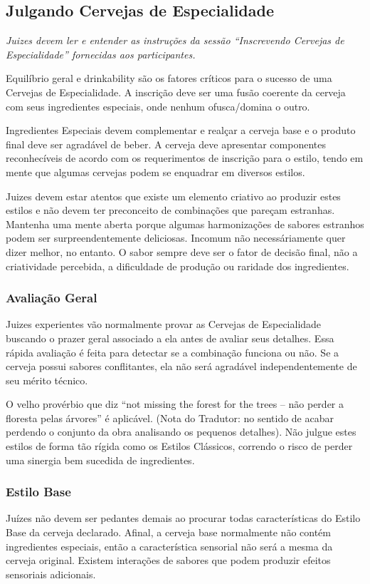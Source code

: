 \subsection*{Julgando Cervejas de Especialidade}
\textit{Juizes devem ler e entender as instruções da sessão “Inscrevendo Cervejas de Especialidade” fornecidas aos participantes.}

Equilíbrio geral e drinkability são os fatores críticos para o sucesso de uma Cervejas de Especialidade. A inscrição deve ser uma fusão coerente da cerveja com seus ingredientes especiais, onde nenhum ofusca/domina o outro.

Ingredientes Especiais devem complementar e realçar a cerveja base e o produto final deve ser agradável de beber. A cerveja deve apresentar componentes reconhecíveis de acordo com os requerimentos de inscrição para o estilo, tendo em mente que algumas cervejas podem se enquadrar em diversos estilos.

Juizes devem estar atentos que existe um elemento criativo ao produzir estes estilos e não devem ter preconceito de combinações que pareçam estranhas. Mantenha uma mente aberta porque algumas harmonizações de sabores estranhos podem ser surpreendentemente deliciosas. Incomum não necessáriamente quer dizer melhor, no entanto. O sabor sempre deve ser o fator de decisão final, não a criatividade percebida, a dificuldade de produção ou raridade dos ingredientes.

\subsubsection*{Avaliação Geral}
Juizes experientes vão normalmente provar as Cervejas de Especialidade buscando o prazer geral associado a ela antes de avaliar seus detalhes. Essa rápida avaliação é feita para detectar se a combinação funciona ou não. Se a cerveja possui sabores conflitantes, ela não será agradável independentemente de seu mérito técnico.

O velho provérbio que diz “not missing the forest for the trees – não perder a floresta pelas árvores” é aplicável. (Nota do Tradutor: no sentido de acabar perdendo o conjunto da obra analisando os pequenos detalhes). Não julgue estes estilos de forma tão rígida como os Estilos Clássicos, correndo o risco de perder uma sinergia bem sucedida de ingredientes.

\subsubsection*{Estilo Base}
Juízes não devem ser pedantes demais ao procurar todas características do Estilo Base da cerveja declarado. Afinal, a cerveja base normalmente não contém ingredientes especiais, então a característica sensorial não será a mesma da cerveja original. Existem interações de sabores que podem produzir efeitos sensoriais adicionais.

